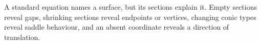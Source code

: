 \begin{summarybox}
A standard equation names a surface, but its sections explain it. Empty sections
reveal gaps, shrinking sections reveal endpoints or vertices, changing conic
types reveal saddle behaviour, and an absent coordinate reveals a direction of
translation.
\end{summarybox}
